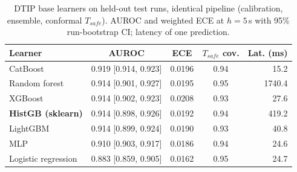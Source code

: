 \begin{table}[t]
\centering
\footnotesize
\caption{DTIP base learners on held-out test runs, identical pipeline (calibration, ensemble, conformal $T_{safe}$). AUROC and weighted ECE at $h=5$\,s with 95\% run-bootstrap CI; latency of one prediction.}
\label{tab:learners}
\setlength{\tabcolsep}{3pt}
\begin{tabular}{lcccr}
\toprule
Learner & AUROC & ECE & $T_{safe}$ cov. & Lat. (ms) \\
\midrule
CatBoost & 0.919 {\scriptsize[0.914, 0.923]} & 0.0196 & 0.94 & 15.2 \\
Random forest & 0.914 {\scriptsize[0.901, 0.927]} & 0.0195 & 0.95 & 1740.4 \\
XGBoost & 0.914 {\scriptsize[0.902, 0.923]} & 0.0208 & 0.93 & 27.6 \\
\textbf{HistGB (sklearn)} & 0.914 {\scriptsize[0.898, 0.926]} & 0.0192 & 0.94 & 419.2 \\
LightGBM & 0.914 {\scriptsize[0.899, 0.924]} & 0.0190 & 0.93 & 40.8 \\
MLP & 0.910 {\scriptsize[0.903, 0.917]} & 0.0186 & 0.94 & 24.6 \\
Logistic regression & 0.883 {\scriptsize[0.859, 0.905]} & 0.0162 & 0.95 & 24.7 \\
\bottomrule
\end{tabular}
\end{table}
